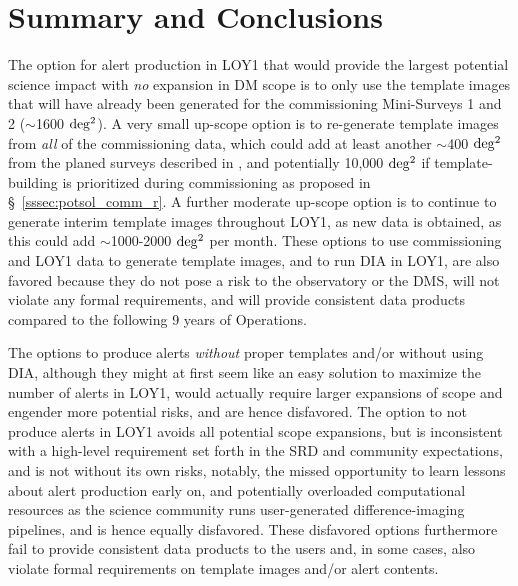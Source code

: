 \documentclass[DM,lsstdraft,toc]{lsstdoc}
\begin{document}
\clearpage
\section{Summary and Conclusions}\label{sec:rec}

The option for alert production in LOY1 that would provide the largest potential science impact with {\em no} expansion in DM scope is to only use the template images that will have already been generated for the commissioning Mini-Surveys 1 and 2 ($\sim$1600 $\rm deg^2$).
A very small up-scope option is to re-generate template images from {\em all} of the commissioning data, which could add at least another $\sim$400 $\rm deg^2$ from the planed surveys described in , and potentially 10,000 $\rm deg^2$ if template-building is prioritized during commissioning as proposed in \S~\ref{sssec:potsol_comm_r}.
A further moderate up-scope option is to continue to generate interim template images throughout LOY1, as new data is obtained, as this could add $\sim$1000-2000 $\rm deg^2$ per month.
These options to use commissioning and LOY1 data to generate template images, and to run DIA in LOY1, are also favored because they do not pose a risk to the observatory or the DMS, will not violate any formal requirements, and will provide consistent data products compared to the following 9 years of Operations. 

The options to produce alerts {\it without} proper templates and/or without using DIA, although they might at first seem like an easy solution to maximize the number of alerts in LOY1, would actually require larger expansions of scope and engender more potential risks, and are hence disfavored.
The  option to not produce alerts in LOY1 avoids all potential scope expansions, but is inconsistent with a high-level requirement set forth in the SRD and community expectations, and is not without its own risks, notably,  the missed opportunity to learn lessons about alert production early on, and potentially overloaded computational resources as the science community runs user-generated difference-imaging pipelines, and is hence equally disfavored. 
These disfavored options furthermore fail to provide consistent data products to the users and, in some cases, also violate formal requirements on template images and/or alert contents.
\end{document}
